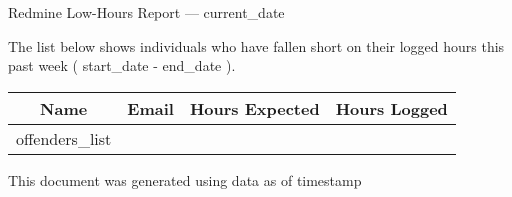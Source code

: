 \documentclass{article}
\begin{document}
\LARGE Redmine Low-Hours Report \normalsize --- {{ current_date }} \newline
\par The list below shows individuals who have fallen short on their logged hours this past week ({{ start_date }} - {{ end_date }}).
\vspace{5mm}
\newline
\begin{tabular}{|c|c|c|c|}
\hline
     \textbf{Name} & \textbf{Email} & \textbf{Hours Expected} & \textbf{Hours Logged}  \\ \hline
       {{ offenders_list }}
\end{tabular}


\begin{center}
    \footnotesize{This document was generated using data as of {{ timestamp }}}
\end{center}
\end{document}
